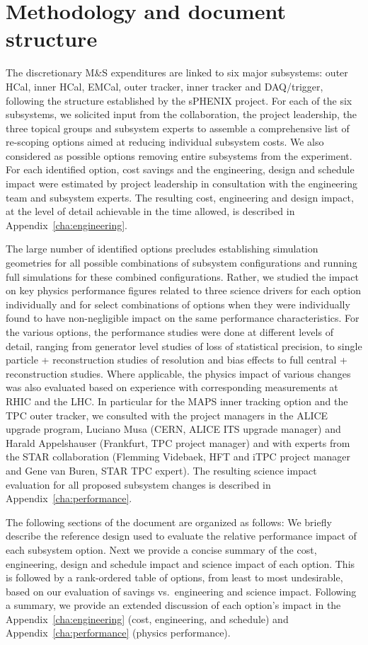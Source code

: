 \section{Methodology and document structure}

The discretionary M\&S expenditures are linked to six major
subsystems: outer HCal, inner HCal, EMCal, outer tracker, inner
tracker and DAQ/trigger, following the structure established by the
sPHENIX project. For each of the six subsystems, we solicited input
from the collaboration, the project leadership, the three topical
groups and subsystem experts to assemble a comprehensive list of
re-scoping options aimed at reducing individual subsystem costs.  We
also considered as possible options removing entire subsystems from
the experiment. For each identified option, cost savings and the
engineering, design and schedule impact were estimated by project
leadership in consultation with the engineering team and subsystem
experts. The resulting cost, engineering and design impact, at the
level of detail achievable in the time allowed, is described in
Appendix~\ref{cha:engineering}.

The large number of identified options precludes establishing
simulation geometries for all possible combinations of subsystem
configurations and running full \geant simulations for these combined
configurations. Rather, we studied the impact on key physics
performance figures related to three science drivers for each option
individually and for select combinations of options when they were
individually found to have non-negligible impact on the same
performance characteristics. For the various options, the performance
studies were done at different levels of detail, ranging from
generator level studies of loss of statistical precision, to single
particle \geant + reconstruction studies of resolution and bias
effects to full central \auau \hijing \geant + reconstruction
studies. Where applicable, the physics impact of various changes was
also evaluated based on experience with corresponding measurements at
RHIC and the LHC. In particular for the MAPS inner tracking option and
the TPC outer tracker, we consulted with the project managers in the
ALICE upgrade program, Luciano Musa (CERN, ALICE ITS upgrade manager)
and Harald Appelshauser (Frankfurt, TPC project manager) and with
experts from the STAR collaboration (Flemming Videbaek, HFT and iTPC
project manager and Gene van Buren, STAR TPC expert). The resulting
science impact evaluation for all proposed subsystem changes is
described in Appendix~\ref{cha:performance}.

The following sections of the document are organized as follows: We
briefly describe the reference design used to evaluate the relative
performance impact of each subsystem option. Next we provide a concise
summary of the cost, engineering, design and schedule impact and
science impact of each option. This is followed by a rank-ordered
table of options, from least to most undesirable, based on our
evaluation of savings vs.\ engineering and science impact. Following a
summary, we provide an extended discussion of each option's impact in
the Appendix~\ref{cha:engineering} (cost, engineering, and schedule)
and Appendix~\ref{cha:performance} (physics performance).


